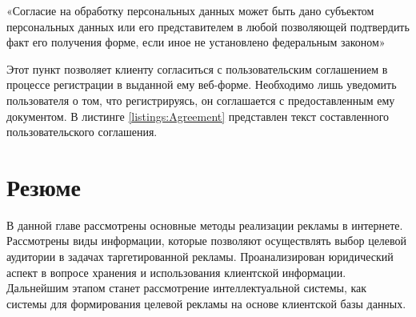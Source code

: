 «Согласие на обработку персональных данных может быть дано субъектом персональных данных или его представителем в любой позволяющей подтвердить факт его получения форме, если иное не установлено федеральным законом»

Этот пункт позволяет клиенту согласиться с пользовательским соглашением в процессе регистрации в выданной ему веб-форме. Необходимо лишь уведомить пользователя о том, что регистрируясь, он соглашается с предоставленным ему документом. В листинге \ref{listings:Agreement} представлен текст составленного пользовательского соглашения.

\section{Резюме}

В данной главе рассмотрены основные методы реализации рекламы в интернете. Рассмотрены виды информации, которые позволяют осуществлять выбор целевой аудитории в задачах таргетированной рекламы. Проанализирован юридический аспект в вопросе хранения и использования клиентской информации. Дальнейшим этапом станет рассмотрение интеллектуальной системы, как системы для формирования целевой рекламы на основе клиентской базы данных.